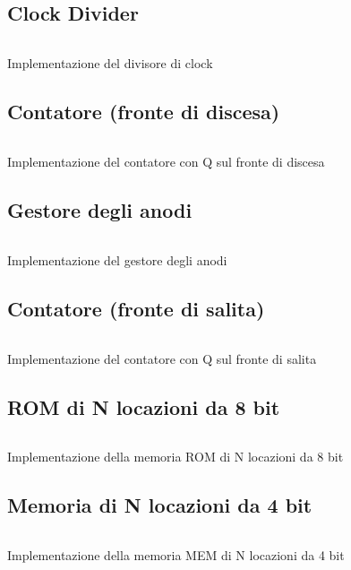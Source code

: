 \subsection*{Clock Divider}
\begin{code}
    \inputminted{vhdl}{vhdl/clock_divider.vhd}
    \caption{Implementazione del divisore di clock}
    \label{cod:clock_divider}
\end{code}

\subsection*{Contatore (fronte di discesa)}
\begin{code}
    \inputminted{vhdl}{vhdl/counter_fallingedge.vhd}
    \caption{Implementazione del contatore con Q sul fronte di discesa}
    \label{cod:counter_fallingedge}
\end{code}

\subsection*{Gestore degli anodi}
\begin{code}
    \inputminted{vhdl}{vhdl/anodes_manager.vhd}
    \caption{Implementazione del gestore degli anodi}
    \label{cod:anodes_manager}
\end{code}

\subsection*{Contatore (fronte di salita)}
\begin{code}
    \inputminted{vhdl}{vhdl/counter_risingedge.vhd}
    \caption{Implementazione del contatore con Q sul fronte di salita}
    \label{cod:counter_risingedge}
\end{code}

\subsection*{ROM di N locazioni da 8 bit}
\begin{code}
    \inputminted{vhdl}{vhdl/ROM_N.vhd}
    \caption{Implementazione della memoria ROM di N locazioni da 8 bit}
    \label{cod:ROM_N}
\end{code}

\subsection*{Memoria di N locazioni da 4 bit}
\begin{code}
    \inputminted{vhdl}{vhdl/MEM_N.vhd}
    \caption{Implementazione della memoria MEM di N locazioni da 4 bit}
    \label{cod:MEM_N}
\end{code}

